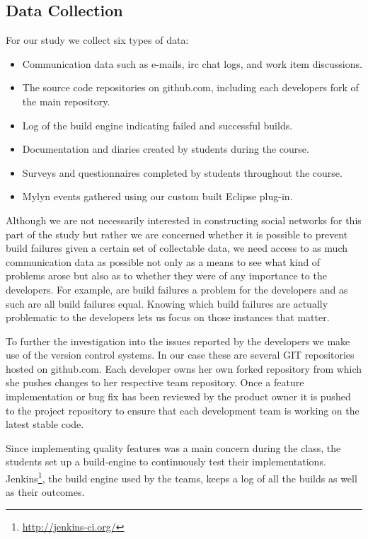 \subsection{Data Collection}
For our study we collect six types of data:
\begin{itemize}
\item Communication data such as e-mails, irc chat logs, and work item discussions.
\item The source code repositories on github.com, including each developers fork of the main repository.
\item Log of the build engine indicating failed and successful builds.
\item Documentation and diaries created by students during the course.
\item Surveys and questionnaires completed by students throughout the course. 
\item Mylyn events gathered using our custom built Eclipse plug-in.
\end{itemize}

Although we are not necessarily interested in constructing social networks for this part of the study but rather we are concerned whether it is possible to prevent build failures given a certain set of collectable data, we need access to as much communication data as possible not only as a means to see what kind of problems arose but also as to whether they were of any importance to the developers.
%
For example, are build failures a problem for the developers and as such are all build failures equal.
Knowing which build failures are actually problematic to the developers lets us focus on those instances that matter.

To further the investigation into the issues reported by the developers we make use of the version control systems.
In our case these are several GIT repositories hosted on github.com.
Each developer owns her own forked repository from which she pushes changes to her respective team repository.
Once a feature implementation or bug fix has been reviewed by the product owner it is pushed to the project repository to ensure that each development team is working on the latest stable code.

Since implementing quality features was a main concern during the class, the students set up a build-engine to continuously test their implementations.
Jenkins\footnote{\url{http://jenkins-ci.org/}}, the build engine used by the teams, keeps a log of all the builds as well as their outcomes.

